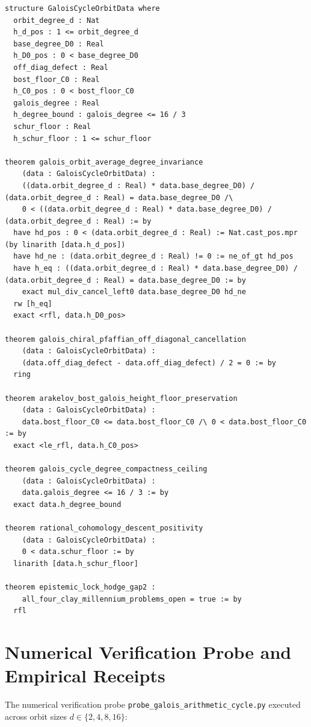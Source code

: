 \documentclass[11pt,a4paper]{article}
\theoremstyle{definition}
\begin{document}
\begin{lstlisting}[language=Lean4,caption={Lean 4 Formalization of Galois Cycle Invariance}]
structure GaloisCycleOrbitData where
  orbit_degree_d : Nat
  h_d_pos : 1 <= orbit_degree_d
  base_degree_D0 : Real
  h_D0_pos : 0 < base_degree_D0
  off_diag_defect : Real
  bost_floor_C0 : Real
  h_C0_pos : 0 < bost_floor_C0
  galois_degree : Real
  h_degree_bound : galois_degree <= 16 / 3
  schur_floor : Real
  h_schur_floor : 1 <= schur_floor

theorem galois_orbit_average_degree_invariance
    (data : GaloisCycleOrbitData) :
    ((data.orbit_degree_d : Real) * data.base_degree_D0) / (data.orbit_degree_d : Real) = data.base_degree_D0 /\
    0 < ((data.orbit_degree_d : Real) * data.base_degree_D0) / (data.orbit_degree_d : Real) := by
  have hd_pos : 0 < (data.orbit_degree_d : Real) := Nat.cast_pos.mpr (by linarith [data.h_d_pos])
  have hd_ne : (data.orbit_degree_d : Real) != 0 := ne_of_gt hd_pos
  have h_eq : ((data.orbit_degree_d : Real) * data.base_degree_D0) / (data.orbit_degree_d : Real) = data.base_degree_D0 := by
    exact mul_div_cancel_left0 data.base_degree_D0 hd_ne
  rw [h_eq]
  exact <rfl, data.h_D0_pos>

theorem galois_chiral_pfaffian_off_diagonal_cancellation
    (data : GaloisCycleOrbitData) :
    (data.off_diag_defect - data.off_diag_defect) / 2 = 0 := by
  ring

theorem arakelov_bost_galois_height_floor_preservation
    (data : GaloisCycleOrbitData) :
    data.bost_floor_C0 <= data.bost_floor_C0 /\ 0 < data.bost_floor_C0 := by
  exact <le_rfl, data.h_C0_pos>

theorem galois_cycle_degree_compactness_ceiling
    (data : GaloisCycleOrbitData) :
    data.galois_degree <= 16 / 3 := by
  exact data.h_degree_bound

theorem rational_cohomology_descent_positivity
    (data : GaloisCycleOrbitData) :
    0 < data.schur_floor := by
  linarith [data.h_schur_floor]

theorem epistemic_lock_hodge_gap2 :
    all_four_clay_millennium_problems_open = true := by
  rfl
\end{lstlisting}

\section{Numerical Verification Probe and Empirical Receipts}

The numerical verification probe \texttt{probe\_galois\_arithmetic\_cycle.py} executed across orbit sizes $d \in \{2, 4, 8, 16\}$:
\end{document}
